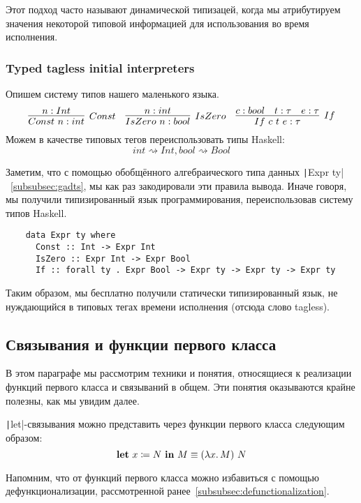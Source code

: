 Этот подход часто называют динамической типизацей, когда мы атрибутируем значения некоторой типовой информацией для использования во время исполнения.

\subsubsection{Typed tagless initial interpreters} \label{subsubsec:tagless-initial}

Опишем систему типов нашего маленького языка.
\begin{equation*}{}
    \infer[Const]{Const~n : int}{n : Int}
    \quad
    \infer[IsZero]{IsZero~n : bool}{n : int}
    \quad
    \infer[If]{If~c~t~e : \tau}{c : bool & t : \tau & e : \tau}
\end{equation*}
Можем в качестве типовых тегов переиспользовать типы Haskell: \[int \rightsquigarrow Int, bool \rightsquigarrow Bool\]

Заметим, что с помощью обобщённого алгебраического типа данных \texttt|Expr ty|~\ref{subsubsec:gadts}, мы как раз закодировали эти правила вывода.
Иначе говоря, мы получили типизированный язык программирования, переиспользовав систему типов Haskell.
\begin{verbatim}
    data Expr ty where
      Const :: Int -> Expr Int
      IsZero :: Expr Int -> Expr Bool
      If :: forall ty . Expr Bool -> Expr ty -> Expr ty -> Expr ty
\end{verbatim}

Таким образом, мы бесплатно получили статически типизированный язык, не нуждающийся в типовых тегах времени исполнения (отсюда слово tagless).

\subsection{Связывания и функции первого класса} \label{subsec:first-class-functions}

В этом параграфе мы рассмотрим техники и понятия, относящиеся к реализации функций первого класса и связываний в общем.
Эти понятия оказываются крайне полезны, как мы увидим далее.

\texttt|let|-связывания можно представить через функции первого класса следующим образом:
\[
    \mathbf{let} ~ x \coloneqq N ~ \mathbf{in} ~ M \equiv (\lambda x\ldotp M) ~ N
\]

Напомним, что от функций первого класса можно избавиться с помощью дефункционализации, рассмотренной ранее~\ref{subsubsec:defunctionalization}.

